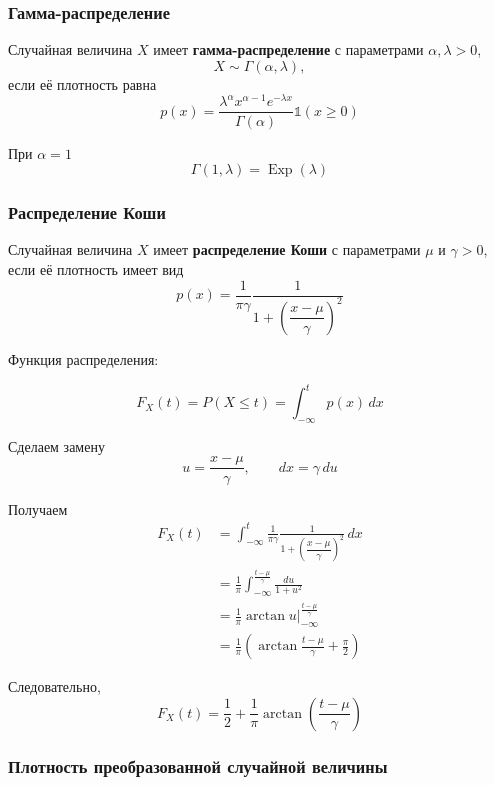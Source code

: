 \documentclass[12pt,a4paper]{article}
\begin{document}
\subsubsection{Гамма-распределение}

\begin{definition}

Случайная величина $X$ имеет \textbf{гамма-распределение} с параметрами $\alpha,\lambda>0$,
\[
X\sim\Gamma(\alpha,\lambda),
\]
если её плотность равна
\[
p(x)
=
\frac{\lambda^\alpha x^{\alpha-1}e^{-\lambda x}}
{\Gamma(\alpha)}
\mathds{1}(x\geq0)
\]

При $\alpha=1$
\[
\Gamma(1,\lambda)=\operatorname{Exp}(\lambda)
\]

\end{definition}

\subsubsection{Распределение Коши}

\begin{definition}

Случайная величина $X$ имеет \textbf{распределение Коши} с параметрами $\mu$ и $\gamma>0$, если её плотность имеет вид
\[
p(x)
=
\frac{1}{\pi\gamma}
\frac{1}{
1+\left(\dfrac{x-\mu}{\gamma}\right)^2
}
\]

\end{definition}

Функция распределения:

\[
F_X(t)
=
P(X\leq t)
=
\int_{-\infty}^{t}p(x)\,dx
\]

Сделаем замену
\[
u=\frac{x-\mu}{\gamma},
\qquad
dx=\gamma\,du
\]

Получаем
\[
\begin{aligned}
F_X(t)
&=
\int_{-\infty}^{t}
\frac{1}{\pi\gamma}
\frac{1}{
1+\left(\dfrac{x-\mu}{\gamma}\right)^2
}\,dx\\
&=
\frac{1}{\pi}
\int_{-\infty}^{\frac{t-\mu}{\gamma}}
\frac{du}{1+u^2}\\
&=
\frac{1}{\pi}
\left.
\arctan u
\right|_{-\infty}^{\frac{t-\mu}{\gamma}}\\
&=
\frac{1}{\pi}
\left(
\arctan\frac{t-\mu}{\gamma}
+\frac{\pi}{2}
\right)
\end{aligned}
\]

Следовательно,
\[
F_X(t)
=
\frac12+
\frac{1}{\pi}
\arctan\left(\frac{t-\mu}{\gamma}\right)
\]

\subsubsection{Плотность преобразованной случайной величины}
\end{document}
